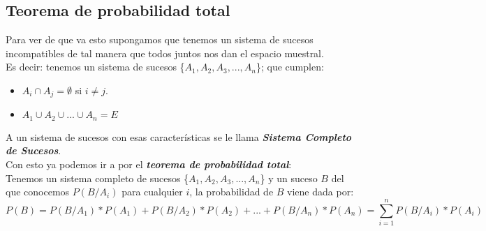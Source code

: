 \documentclass[a4paper,10pt,answers]{exam}
\begin{document}
\subsection{Teorema de probabilidad total}
Para ver de que va esto supongamos que tenemos un sistema de sucesos incompatibles de tal manera que todos juntos nos dan el espacio muestral.\\
Es decir: tenemos un sistema de sucesos \{$A_1, A_2, A_3, ..., A_n$\}; que cumplen:
\begin{itemize}
	\item $A_i \cap A_j = \emptyset$ si $i \neq j$.
	\item $A_1 \cup A_2 \cup ... \cup A_n = E$
\end{itemize}
A un sistema de sucesos con esas características se le llama \emph{\textbf{Sistema Completo de Sucesos}}.\\

Con esto ya podemos ir a por el \emph{\textbf{teorema de probabilidad total}}:\\
Tenemos un sistema completo de sucesos \{$A_1, A_2, A_3, ..., A_n$\} y un suceso $B$ del que conocemos $P(B/A_i)$ para cualquier $i$, la probabilidad de $B$ viene dada por:
\[P(B) = P(B/A_1) * P(A_1) + P(B/A_2) *P(A_2) + ... + P(B/A_n) *P(A_n) = \sum_{i=1}^n P(B/A_i) * P(A_i)\]\\
\end{document}
